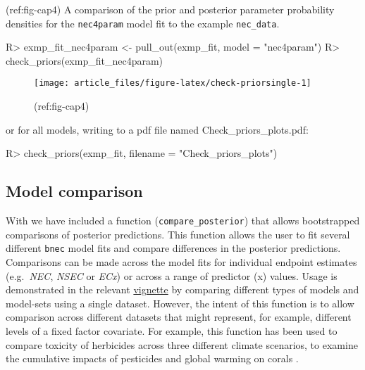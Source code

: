 \documentclass[
]{jss}
\begin{document}
(ref:fig-cap4) A comparison of the prior and posterior parameter
probability densities for the \texttt{nec4param} model fit to the
example \texttt{nec\_data}.

\begin{CodeChunk}
\begin{CodeInput}
R> exmp_fit_nec4param <- pull_out(exmp_fit, model = "nec4param")
R> check_priors(exmp_fit_nec4param)
\end{CodeInput}
\begin{figure}

{\centering \texttt{[image: article\_files/figure-latex/check-priorsingle-1]} 

}

\caption[(ref:fig-cap4)]{(ref:fig-cap4)}\label{fig:check-priorsingle}
\end{figure}
\end{CodeChunk}

or for all models, writing to a pdf file named Check\_priors\_plots.pdf:

\begin{CodeChunk}
\begin{CodeInput}
R> check_priors(exmp_fit, filename = "Check_priors_plots")
\end{CodeInput}
\end{CodeChunk}

\hypertarget{model-comparison}{%
\subsection{Model comparison}\label{model-comparison}}

With  we have included a function
(\texttt{compare\_posterior}) that allows bootstrapped comparisons of
posterior predictions. This function allows the user to fit several
different \texttt{bnec} model fits and compare differences in the
posterior predictions. Comparisons can be made across the model fits for
individual endpoint estimates (e.g.~\emph{NEC}, \emph{NSEC} or
\emph{ECx}) or across a range of predictor (x) values. Usage is
demonstrated in the relevant
\href{https://open-aims.github.io/bayesnec/articles/example4.html}{vignette}
by comparing different types of models and model-sets using a single
dataset. However, the intent of this function is to allow comparison
across different datasets that might represent, for example, different
levels of a fixed factor covariate. For example, this function has been
used to compare toxicity of herbicides across three different climate
scenarios, to examine the cumulative impacts of pesticides and global
warming on corals \citep{flores2021}.
\end{document}
